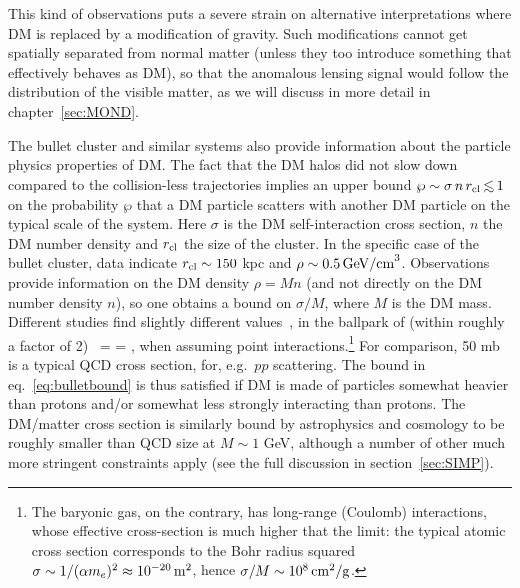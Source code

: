 This kind of observations puts a severe strain on alternative interpretations where DM is replaced by a modification of gravity.  
Such modifications cannot get spatially separated from normal matter (unless they too introduce something that effectively behaves as DM),
so that the anomalous lensing signal would follow the distribution of the visible matter, as we will discuss in more detail in chapter~\ref{sec:MOND}.

\medskip

The bullet cluster and similar systems also provide information about the particle physics properties of DM. The fact that the DM halos did not slow down compared to the collision-less trajectories implies an upper bound 
 $\wp \sim \sigma \, n \, r_{\rm cl} \circa{<}1$ 
on the probability $\wp$ that a DM particle scatters with another DM particle on the typical scale of the system.
Here $\sigma$ is the DM self-interaction cross section, 
$n$ the DM number density and $r_{\rm cl}$ the size of the cluster.
In the specific case of the bullet cluster, data indicate  $r_{\rm cl} \sim 150$ kpc
and $\rho \sim 0.5 \, {\rm GeV/cm}^3$.
Observations provide information on the DM density $\rho = M n$ (and not directly on the DM number density $n$), 
so one obtains a bound on $\sigma/M$, where $M$ is the DM mass.
Different studies find slightly different values~\cite{bulletcluster,selfinteractionlimits}, 
in the ballpark  of (within roughly a factor of 2)
\beq \label{eq:bulletbound}
\, = =
,
\eeq 
when assuming point interactions.\footnote{The baryonic gas, on the contrary, has long-range (Coulomb) interactions, whose effective cross-section is much higher that the limit: the typical atomic cross section corresponds to the Bohr radius squared $\sigma \sim 1/(\alpha m_e)^2 \approx 10^{-20} \, {\rm m}^2$, hence $\sigma/M \sim 10^8 \, {\rm cm}^2/{\rm g}$.} For comparison, 50 mb is a typical QCD cross section, for, e.g.\ $pp$ scattering.
The bound in eq.~\eqref{eq:bulletbound} is thus satisfied if DM is made of particles somewhat heavier than protons and/or somewhat less strongly interacting than protons.
The DM/matter cross section is similarly bound by astrophysics and cosmology to be roughly smaller than QCD size at $M\sim 1$ GeV, although a number of other much more stringent constraints apply (see the full discussion in section~\ref{sec:SIMP}).



\medskip

